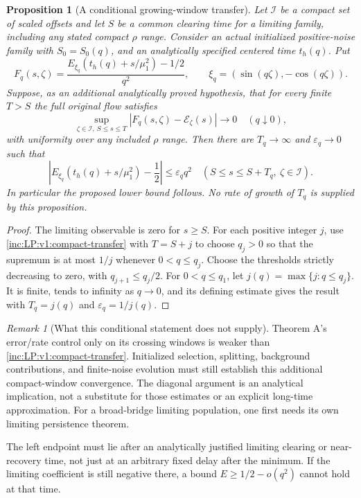 \documentclass[11pt]{article}
\numberwithin{equation}{section}
\newtheorem{proposition}[theorem]{Proposition}
\theoremstyle{remark}\newtheorem{remark}[theorem]{Remark}
\begin{document}
\begin{proposition}[A conditional growing-window transfer]
\label{inc:LP:v1:diagonal-transfer}
Let $\mathcal I$ be a compact set of scaled offsets and let $S$ be a common
clearing time for a limiting family, including any stated compact $\rho$
range. Consider an \emph{actual initialized} positive-noise family with
$S_0=S_0(q)$, and an analytically specified centered time $t_h(q)$.
Put
\[
 F_q(s,\zeta)=
 \frac{E_{\xi_q}(t_h(q)+s/\mu_1^2)-1/2}{q^2},\qquad
 \xi_q=(\sin(q\zeta),-\cos(q\zeta)).
\]
Suppose, as an additional analytically proved hypothesis, that for every
finite $T>S$ the full original flow satisfies
\begin{equation}\label{inc:LP:v1:compact-transfer}
 \sup_{\zeta\in\mathcal I,\ S\le s\le T}
 |F_q(s,\zeta)-\mathcal E_\zeta(s)|\longrightarrow0
 \quad(q\downarrow0),
\end{equation}
with uniformity over any included $\rho$ range. Then there are
$T_q\to\infty$ and $\varepsilon_q\to0$ such that
\[
 \left|E_{\xi_q}(t_h(q)+s/\mu_1^2)-\frac12\right|
 \le\varepsilon_q q^2
 \quad(S\le s\le S+T_q,\ \zeta\in\mathcal I).
\]
In particular the proposed lower bound follows. No rate of growth of
$T_q$ is supplied by this proposition.
\end{proposition}
\begin{proof}
The limiting observable is zero for $s\ge S$. For each positive integer
$j$, use \eqref{inc:LP:v1:compact-transfer} with $T=S+j$ to choose
$q_j>0$ so that the supremum is at most $1/j$ whenever $0<q\le q_j$.
Choose the thresholds strictly decreasing to zero, with
$q_{j+1}\le q_j/2$. For $0<q\le q_1$, let
$j(q)=\max\{j:q\le q_j\}$. It is finite, tends to infinity as $q\to0$,
and its defining estimate gives the result with
$T_q=j(q)$ and $\varepsilon_q=1/j(q)$.
\end{proof}

\begin{remark}[What this conditional statement does not supply]
Theorem A's error/rate control only on its crossing windows is weaker than
\eqref{inc:LP:v1:compact-transfer}. Initialized selection, splitting,
background contributions, and finite-noise evolution must still establish
this additional compact-window convergence. The diagonal argument is an
analytical implication, not a substitute for those estimates or an explicit
long-time approximation. For a broad-bridge limiting population, one first
needs its own limiting persistence theorem.

The left endpoint must lie after an analytically justified limiting clearing
or near-recovery time, not just at an arbitrary fixed delay after the
minimum. If the limiting coefficient is still negative there, a bound
$E\ge1/2-o(q^2)$ cannot hold at that time.
\end{remark}
\end{document}
